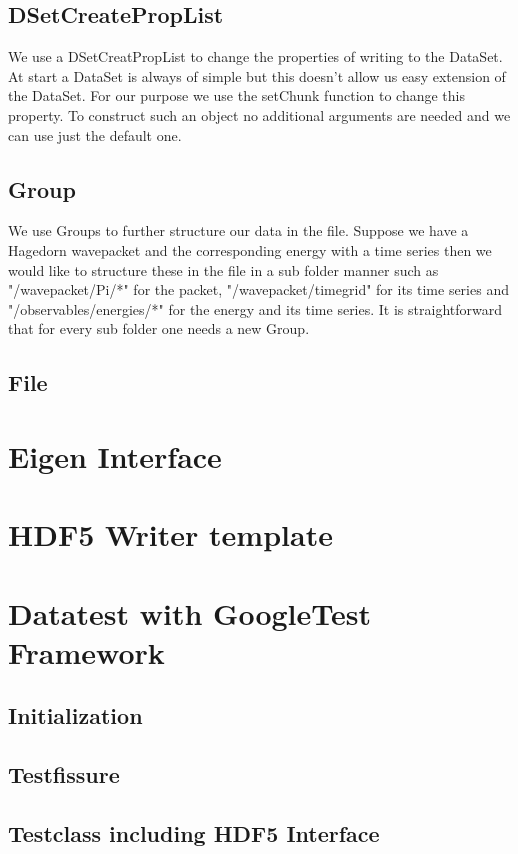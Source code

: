 \documentclass{article}
\begin{document}
\subsection{DSetCreatePropList}
We use a DSetCreatPropList to change the properties of writing to the DataSet. At start a DataSet is always of simple but this doesn't allow us easy extension of the DataSet. For our purpose we use the setChunk function to change this property. To construct such an object no additional arguments are needed and we can use just the default one.
\subsection{Group}
We use Groups to further structure our data in the file. Suppose we have a Hagedorn wavepacket and the corresponding energy with a time series then we would like to structure these in the file in a sub folder manner such as "/wavepacket/Pi/*" for the packet, "/wavepacket/timegrid" for its time series and "/observables/energies/*" for the energy and its time series. It is straightforward that for every sub folder one needs a new Group. 
\subsection{File}

\section{Eigen Interface}

\section{HDF5 Writer template}

\section{Datatest with GoogleTest Framework}
\subsection{Initialization}
\subsection{Testfissure}
\subsection{Testclass including HDF5 Interface}






\end{document}
